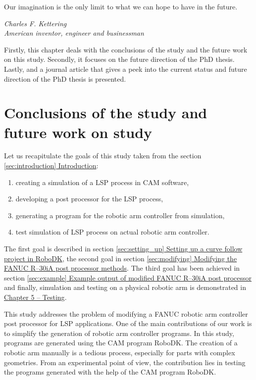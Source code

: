 \label{chap:discussion}



\epigraph{Our imagination is the only limit to what we can hope to have in the future.}{\textit{Charles F. Kettering \\ American inventor, engineer and businessman }}

Firstly, this chapter deals with the conclusions of the study and the future work on this study. Secondly, it focuses on the future direction of the PhD thesis. Lastly, and a journal article that gives a peek into the current status and future direction of the PhD thesis is presented.

\section{Conclusions of the study and future work on study}

Let us recapitulate the goals of this study taken from the section \hyperref[sec:introduction]{\ref{sec:introduction} Introduction}:

\begin{enumerate}

    \item creating a simulation of a LSP process in CAM software,
    \item developing a post processor for the LSP process, 
    \item generating a program  for the robotic arm controller from simulation,
    \item test simulation of LSP process on actual robotic arm controller.
    
\end{enumerate}

The first goal is described in section  \hyperref[sec:setting_up]{\ref{sec:setting_up} Setting up a curve follow project in RoboDK}, the second goal in section  \hyperref[sec:modifying]{\ref{sec:modifying} Modifying the FANUC R--30iA post processor methods}. The third goal has been achieved in section  \hyperref[sec:example]{\ref{sec:example} Example output of modified FANUC R–30iA post processor} and finally, simulation and testing on a physical robotic arm is demonstrated in \hyperref[chap:testing]{Chapter 5 -- Testing}.

This study addresses the problem of modifying a FANUC robotic arm controller post processor for LSP applications. One of the main contributions of our work is to simplify the generation of robotic arm controller programs. In this study, programs are generated using the CAM  program RoboDK. The creation of a robotic arm manually is a tedious process, especially for parts with complex geometries. From an experimental point of view, the contribution lies in testing the programs generated with the help of the CAM program RoboDK.

